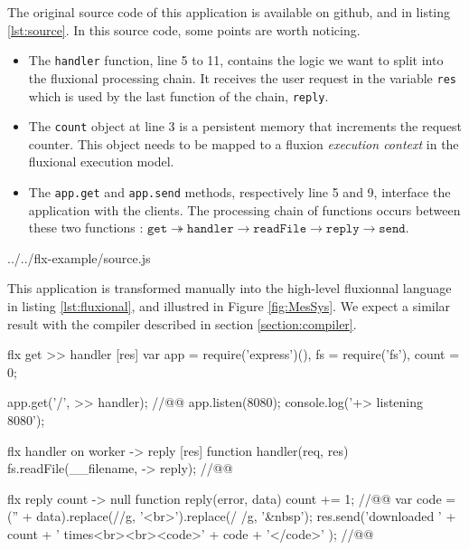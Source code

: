 The original source code of this application is available on github\cite{flx-example}, and in listing \ref{lst:source}.
In this source code, some points are worth noticing.

\begin{itemize}
  \item The \texttt{handler} function, line 5 to 11, contains the logic we want to split into the fluxional processing chain.
  It receives the user request in the variable \texttt{res} which is used by the last function of the chain, \texttt{reply}.
  \item The \texttt{count} object at line 3 is a persistent memory that increments the request counter.
  This object needs to be mapped to a fluxion \textit{execution context} in the fluxional execution model.
  \item The \texttt{app.get} and \texttt{app.send} methods, respectively line 5 and 9, interface the application with the clients.
  The processing chain of functions occurs between these two functions : $\texttt{get} \twoheadrightarrow \texttt{handler} \to \texttt{readFile} \to \texttt{reply} \to \texttt{send}$.
\end{itemize}

{../../flx-example/source.js}

This application is transformed manually into the high-level fluxionnal language in listing \ref{lst:fluxional}, and illustred in Figure \ref{fig:MesSys}.
We expect a similar result with the compiler described in section \ref{section:compiler}.


\begin{code}[flx, caption={Manual transformation of the example application in our high-level fluxional language},label={lst:fluxional}]
flx get
>> handler [res]
  var app = require('express')(),
      fs = require('fs'),
      count = 0;

  app.get('/', >> handler); //@\label{lst:fluxional-streamtohandler}@
  app.listen(8080);
  console.log('+> listening 8080');

flx handler on worker
-> reply [res]
  function handler(req, res) {
    fs.readFile(__filename, -> reply); //@\label{lst:fluxional-readfile}@
  }

flx reply {count}
-> null
  function reply(error, data) {
    count += 1; //@\label{lst:fluxional-counter}@
    var code = ('' + data).replace(/\n/g, '<br>').replace(/ /g, '&nbsp');
    res.send('downloaded ' + count + ' times<br><br><code>' + code + '</code>' ); //@\label{lst:fluxional-ressend}@
  }
\end{code}


